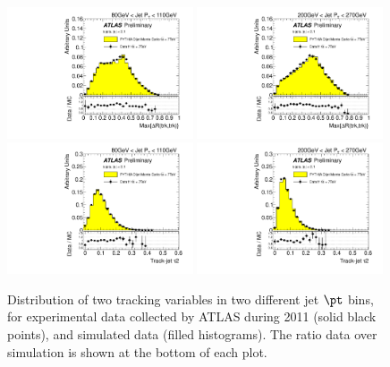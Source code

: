 \begin{figure}[tp]
\centering
\includegraphics[width=0.49\textwidth]{FIGS/dataMC/FullDataVarDRmaxPT080.pdf}
\includegraphics[width=0.49\textwidth]{FIGS/dataMC/FullDataVarDRmaxPT200.pdf}
\includegraphics[width=0.49\textwidth]{FIGS/dataMC/FullDataVarTau2PT080.pdf}
\includegraphics[width=0.49\textwidth]{FIGS/dataMC/FullDataVarTau2PT200.pdf}  
\caption{ Distribution of two tracking variables in two different jet $\pt$ bins, for experimental data  collected by ATLAS during 2011 (solid black points), and simulated data (filled histograms). The ratio data over simulation is shown at the bottom of each plot.}
\label{fig:datamcinputvars2}
\end{figure}



